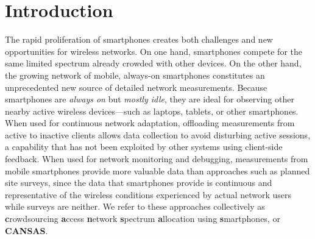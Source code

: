 \section{Introduction}

The rapid proliferation of smartphones creates both challenges and new
opportunities for wireless networks. On one hand, smartphones compete for the
same limited spectrum already crowded with other devices. On the other hand,
the growing network of mobile, always-on smartphones constitutes an
unprecedented new source of detailed network measurements. Because
smartphones are \textit{always on} but \textit{mostly idle}, they are ideal
for observing other nearby active wireless devices---such as laptops,
tablets, or other smartphones. When used for continuous network adaptation,
offloading measurements from active to inactive clients allows data
collection to avoid disturbing active sessions, a capability that has not
been exploited by other systems using client-side feedback. When used for
network monitoring and debugging, measurements from mobile smartphones
provide more valuable data than approaches such as planned site surveys,
since the data that smartphones provide is continuous and representative of
the wireless conditions experienced by actual network users while surveys are
neither. We refer to these approaches collectively as \textbf{c}rowdsourcing
\textbf{a}ccess \textbf{n}etwork \textbf{s}pectrum \textbf{a}llocation using
\textbf{s}martphones, or \textbf{CANSAS}.

